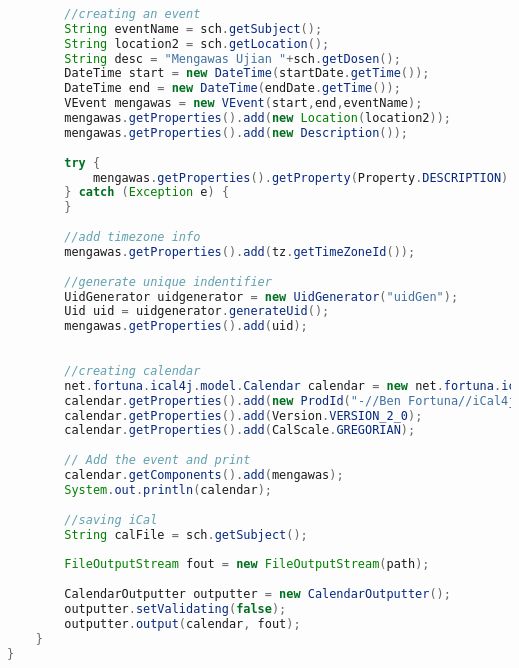 \begin{lstlisting}[language=Java,basicstyle=\tiny,caption=CalendarConverter.java,label=lst:CalendarConverter]
        
        //creating an event
        String eventName = sch.getSubject();
        String location2 = sch.getLocation();
        String desc = "Mengawas Ujian "+sch.getDosen();
        DateTime start = new DateTime(startDate.getTime());
        DateTime end = new DateTime(endDate.getTime());
        VEvent mengawas = new VEvent(start,end,eventName);
        mengawas.getProperties().add(new Location(location2));
        mengawas.getProperties().add(new Description());
        
        try {
            mengawas.getProperties().getProperty(Property.DESCRIPTION).setValue(desc);
        } catch (Exception e) {
        }
        
        //add timezone info
        mengawas.getProperties().add(tz.getTimeZoneId());
        
        //generate unique indentifier
        UidGenerator uidgenerator = new UidGenerator("uidGen");
        Uid uid = uidgenerator.generateUid();
        mengawas.getProperties().add(uid);
        
        
        //creating calendar
        net.fortuna.ical4j.model.Calendar calendar = new net.fortuna.ical4j.model.Calendar();
        calendar.getProperties().add(new ProdId("-//Ben Fortuna//iCal4j 1.0//EN"));
        calendar.getProperties().add(Version.VERSION_2_0);
        calendar.getProperties().add(CalScale.GREGORIAN);
        
        // Add the event and print
        calendar.getComponents().add(mengawas);
        System.out.println(calendar);
        
        //saving iCal
        String calFile = sch.getSubject();
        
        FileOutputStream fout = new FileOutputStream(path);
        
        CalendarOutputter outputter = new CalendarOutputter();
        outputter.setValidating(false);
        outputter.output(calendar, fout);    
    }   
}

\end{lstlisting}

